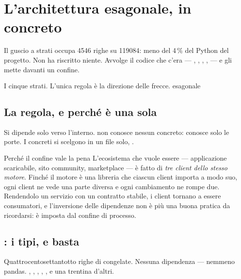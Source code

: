 \section{L'architettura esagonale, in concreto}\label{sez:esagonale}

Il guscio a strati occupa \num{4546} righe su \num{119084}: meno del
\num{4}\,\% del Python del progetto. Non ha riscritto niente. Avvolge il
codice che c'era --- \pkgStrategie, \pkgReport, \pkgEsecuzione, \pkgLive,
\pkgDati{} --- e gli mette davanti un confine.

  {I cinque strati. L'unica regola è la direzione delle frecce.}
  {esagonale}

\subsection{La regola, e perché è una sola}

Si dipende solo verso l'interno. \pkgApplicazione{} non conosce nessun
concreto: conosce solo le porte. I concreti si scelgono in un file solo,
.

\begin{perche}{Perché il confine vale la pena}
L'ecosistema che \Lyra{} vuole essere --- applicazione scaricabile, sito
community, marketplace --- è fatto di \emph{tre client dello stesso motore}.
Finché il motore è una libreria che ciascun client importa a modo suo, ogni
client ne vede una parte diversa e ogni cambiamento ne rompe due. Rendendolo
un servizio con un contratto stabile, i client tornano a essere consumatori, e
l'inversione delle dipendenze non è più una buona pratica da ricordarsi: è
imposta dal confine di processo.
\end{perche}

\subsection{\pkgDominio: i tipi, e basta}

Quattrocentosettantotto righe di  congelate. Nessuna
dipendenza --- nemmeno pandas. , ,
, , ,
 e una trentina d'altri.

